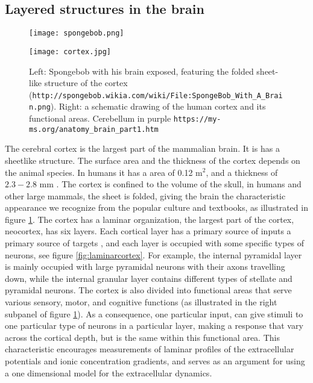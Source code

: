 \documentclass{article}
\begin{document}
\subsection{Layered structures in the brain}\label{Layered structures}
\begin{figure}[!tbp]
  \centering
  \begin{minipage}[b]{0.45\textwidth}
    \texttt{[image: spongebob.png]}
  \end{minipage}
  \begin{minipage}[b]{0.45\textwidth}
    \texttt{[image: cortex.jpg]}
  \end{minipage}  
   \caption{Left: Spongebob with his brain exposed, featuring the folded sheet-like structure of the cortex (\texttt{http://spongebob.wikia.com/wiki/File:SpongeBob\_With\_A\_Brain.png}). Right: a schematic drawing of the human cortex and its functional areas. Cerebellum in purple \texttt{https://my-ms.org/anatomy\_brain\_part1.htm}}
  \label{fig:spongebob}
\end{figure}

The cerebral cortex is the largest part of the mammalian brain. It is has a sheetlike structure. The surface area and the thickness of the cortex depends on the animal species. In humans it has a area of 0.12 m$^2$, and a thickness of $2.3 - 2.8$ mm \cite{wikipedia}. The cortex is confined to the volume of the skull, in humans and other large mammals, the sheet is folded, giving the brain the characteristic appearance we recognize from the popular culture and textbooks, as illustrated in figure  \ref{fig:spongebob}.  The cortex has a laminar organization, the largest part of the cortex, neocortex, has six layers. Each cortical layer has a primary source of inputs a primary source of targets \cite{Neuroscience}, and each layer is occupied with some specific types of neurons, see figure \ref{fig:laminarcortex}. For example, the internal pyramidal layer is mainly occupied with large pyramidal neurons with their axons travelling down, while the  internal granular layer contains different types of stellate and pyramidal neurons. The cortex is also divided into functional areas that serve various sensory, motor, and cognitive functions (as illustrated in the right subpanel of figure \ref{fig:spongebob}). As a consequence, one particular input, can give stimuli to one particular type of neurons in a particular layer, making a response that vary across the cortical depth, but is the same within this functional area. This characteristic encourages measurements of laminar profiles of the extracellular potentials and ionic concentration gradients, and serves as an argument for using a one dimensional model for the extracellular dynamics. 
\end{document}
